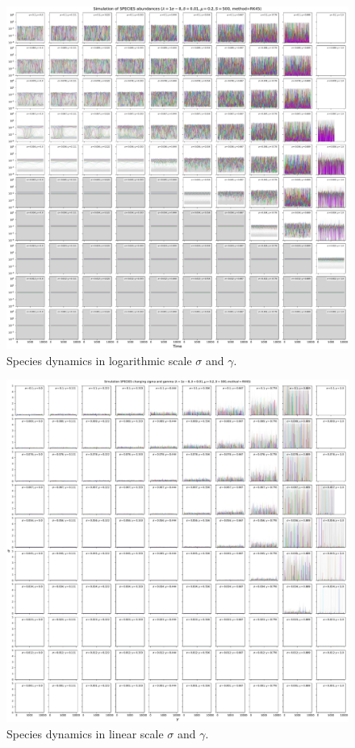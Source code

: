 \documentclass[11pt,a4paper,fleqn]{scrartcl}
\begin{document}
\begin{figure}[H]
    \centering
    \includegraphics[width=\linewidth]{SigmaGamma/10Species.pdf}
    \caption{Species dynamics in logarithmic scale $\sigma$ and $\gamma$.}
\end{figure}

\clearpage

\begin{figure}[H]
    \centering
    \includegraphics[width=\linewidth]{SigmaGamma/10SpeciesLinear.pdf}
    \caption{Species dynamics in linear scale $\sigma$ and $\gamma$.}
\end{figure}
\end{document}
